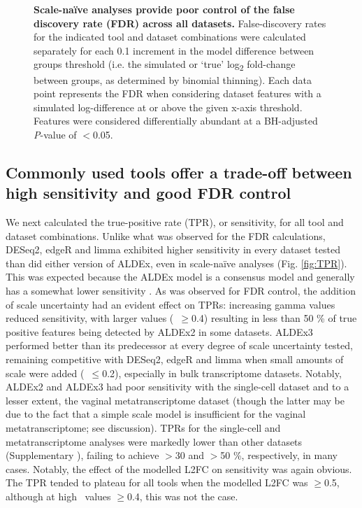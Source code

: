 \documentclass[10pt,letterpaper]{article}
\begin{document}
\begin{figure}[H]
    \centering
    \caption{\textbf{Scale-na\"ive analyses provide poor control of the false discovery rate (FDR) across all datasets.} False-discovery rates for the indicated tool and dataset combinations were calculated separately for each 0.1 increment in the model difference between groups threshold (i.e. the simulated or `true' log\textsubscript{2} fold-change between groups, as determined by binomial thinning). Each data point represents the FDR when considering dataset features with a simulated log-difference at or above the given x-axis threshold. Features were considered differentially abundant at a BH-adjusted \textit{P}-value of $<$0.05.}
    \label{fig:FDR}
\end{figure}

\subsection*{Commonly used tools offer a trade-off between high sensitivity and good FDR control}
We next calculated the true-positive rate (TPR), or sensitivity, for all tool and dataset combinations. Unlike what was observed for the FDR calculations, DESeq2, edgeR and limma exhibited higher sensitivity in every dataset tested than did either version of ALDEx, even in scale-na\"ive analyses  (Fig. \ref{fig:TPR}). This was expected because the ALDEx model is a consensus model \cite{fernandes:2014} and generally has a somewhat lower sensitivity \cite{hawinkel2017, Nearing:2022aa}. As was observed for FDR control, the addition of scale uncertainty had an evident effect on TPRs: increasing gamma values reduced sensitivity, with larger values (\textgamma~$\geq$0.4) resulting in less than 50 \% of true positive features being detected by ALDEx2 in some datasets. ALDEx3 performed better than its predecessor at every degree of scale uncertainty tested, remaining competitive with DESeq2, edgeR and limma when small amounts of scale were added (\textgamma~$\leq$0.2), especially in bulk transcriptome datasets. Notably, ALDEx2 and ALDEx3 had poor sensitivity with the single-cell dataset and to a lesser extent, the vaginal metatranscriptome dataset (though the latter may be due to the fact that a simple scale model is insufficient for the vaginal metatranscriptome; see discussion). TPRs for the single-cell and metatranscriptome analyses were markedly lower than other datasets (Supplementary ), failing to achieve $>$30 and $>$50 \%, respectively, in many cases. Notably, the effect of the modelled L2FC on sensitivity was again obvious. The TPR tended to plateau for all tools when the modelled L2FC was $\geq$0.5, although at high \textgamma~values $\ge$0.4, this was not the case. 
\end{document}
